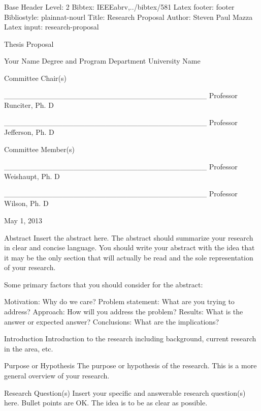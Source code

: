 
\def\mytitle{}
\def\myauthor{}
\def\latexmode{memoir}

Base Header Level: 2
Bibtex: IEEEabrv,..\slash bibtex\slash 581
Latex footer: footer
Bibliostyle: plainnat-nourl
Title: Research Proposal
Author: Steven Paul Mazza
Latex input: research-proposal

\pagebreak 

Thesis Proposal

Your Name
Degree and Program
Department
University Name

Committee Chair(s)

\_\_\_\_\_\_\_\_\_\_\_\_\_\_\_\_\_\_\_\_\_\_\_\_\_\_\_\_\_\_\_\_\_\_\_\_\_\_
Professor Runciter, Ph. D

\_\_\_\_\_\_\_\_\_\_\_\_\_\_\_\_\_\_\_\_\_\_\_\_\_\_\_\_\_\_\_\_\_\_\_\_\_\_
Professor Jefferson, Ph. D

Committee Member(s)

\_\_\_\_\_\_\_\_\_\_\_\_\_\_\_\_\_\_\_\_\_\_\_\_\_\_\_\_\_\_\_\_\_\_\_\_\_\_
Professor Weishaupt, Ph. D

\_\_\_\_\_\_\_\_\_\_\_\_\_\_\_\_\_\_\_\_\_\_\_\_\_\_\_\_\_\_\_\_\_\_\_\_\_\_
Professor Wilson, Ph. D

May 1, 2013

\pagebreak 

Abstract
Insert the abstract here. The abstract should summarize your research in clear and concise language. You should write your abstract with the idea that it may be the only section that will actually be read and the sole representation of your research. 

Some primary factors that you should consider for the abstract:

Motivation: Why do we care?
Problem statement: What are you trying to address?
Approach: How will you address the problem?
Results: What is the answer or expected answer?
Conclusions: What are the implications?

\pagebreak 

Introduction
Introduction to the research including background, current research in the area, etc.

\pagebreak 

Purpose or Hypothesis
The purpose or hypothesis of the research. This is a more general overview of your research.

\pagebreak 

Research Question(s)
Insert your specific and answerable research question(s) here. Bullet points are OK. The idea is to be as clear as possible.

